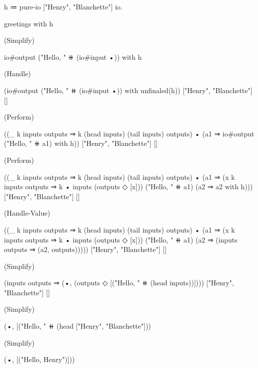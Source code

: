 \begin{snippet}[caption={Handle greetings with pure \IO}]
h ≔ pure-io ["Henry", "Blanchette"] io.

greetings with h

(Simplify)

io#output ("Hello, " ⧺ (io#input •)) with h

(Handle)

(io#output ("Hello, " ⧺ (io#input •)) with unfinaled(h))
  ["Henry", "Blanchette"] []

(Perform)

((_ k inputs outputs ⇒ k (head inputs) (tail inputs) outputs)
  •
  (a1 ⇒ io#output ("Hello, " ⧺ a1) with h))
  ["Henry", "Blanchette"] []

(Perform)

((_ k inputs outputs ⇒ k (head inputs) (tail inputs) outputs)
  •
  (a1 ⇒
    (x k inputs outputs ⇒ k • inputs (outputs ◇ [x]))
    ("Hello, " ⧺ a1)
    (a2 ⇒ a2 with h)))
  ["Henry", "Blanchette"] []

(Handle-Value)

((_ k inputs outputs ⇒ k (head inputs) (tail inputs) outputs)
  •
  (a1 ⇒
    (x k inputs outputs ⇒ k • inputs (outputs ◇ [x]))
      ("Hello, " ⧺ a1)
      (a2 ⇒
        (inputs outputs ⇒ (a2, outputs)))))
  ["Henry", "Blanchette"] []

(Simplify)

(inputs outputs ⇒
  (•, (outputs ◇ [("Hello, " ⧺ (head inputs))])))
  ["Henry", "Blanchette"] []

(Simplify)

(•, [("Hello, " ⧺ (head ["Henry", "Blanchette"]))

(Simplify)

(•, [("Hello, Henry")]))

\end{snippet}
